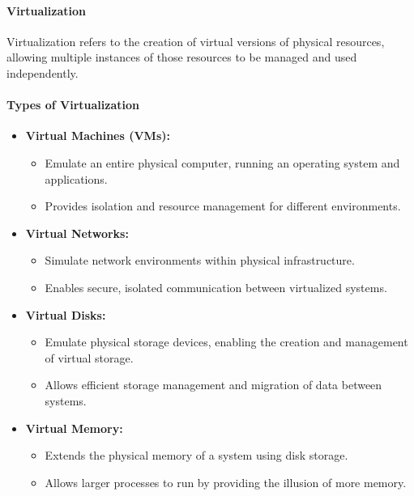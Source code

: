 \documentclass{article}
\begin{document}
\paragraph{Virtualization}
Virtualization refers to the creation of virtual versions of physical resources, allowing multiple instances of those resources to be managed and used independently.

\paragraph{Types of Virtualization}
\begin{itemize}
    \item \textbf{Virtual Machines (VMs):} 
    \begin{itemize}
        \item Emulate an entire physical computer, running an operating system and applications.
        \item Provides isolation and resource management for different environments.
    \end{itemize}
    
    \item \textbf{Virtual Networks:} 
    \begin{itemize}
        \item Simulate network environments within physical infrastructure.
        \item Enables secure, isolated communication between virtualized systems.
    \end{itemize}

    \item \textbf{Virtual Disks:} 
    \begin{itemize}
        \item Emulate physical storage devices, enabling the creation and management of virtual storage.
        \item Allows efficient storage management and migration of data between systems.
    \end{itemize}

    \item \textbf{Virtual Memory:} 
    \begin{itemize}
        \item Extends the physical memory of a system using disk storage.
        \item Allows larger processes to run by providing the illusion of more memory.
    \end{itemize}
\end{itemize}
\end{document}
